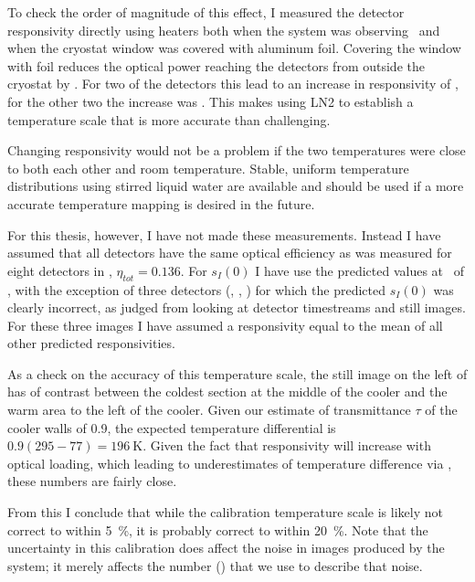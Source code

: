 To check the order of magnitude of this effect, I measured the detector responsivity directly using heaters both when the system was observing \ecco\ and when the cryostat window was covered with aluminum foil.
Covering the window with foil reduces the optical power reaching the detectors from outside the cryostat by .
For two of the detectors this lead to an increase in responsivity of , for the other two the increase was .
This makes using LN2 to establish a temperature scale that is more accurate than  challenging.

Changing responsivity would not be a problem if the two temperatures were close to both each other and room temperature.
Stable, uniform temperature distributions using stirred liquid water are available \cite{dietlein_aqueous_2008} and should be used if a more accurate temperature mapping is desired in the future.

For this thesis, however, I have not made these measurements.
Instead I have assumed that all detectors have the same optical efficiency as was measured for eight detectors in , $\eta_{tot} = 0.136$.
For $s_I(0)$ I have use the predicted values at \SOC\ of , with the exception of three detectors (, , ) for which the predicted $s_I(0)$ was clearly incorrect, as judged from looking at detector timestreams and still images.
For these three images I have assumed a responsivity equal to the mean of all other predicted responsivities.

As a check on the accuracy of this temperature scale, the still image on the left of  has  of contrast between the coldest section at the middle of the cooler and the warm area to the left of the cooler.
Given our estimate of transmittance $\tau$ of the cooler walls of \num{0.9}, the expected temperature differential is $0.9(295-77) = \SI{196}{\K}$.
Given the fact that responsivity will increase with optical loading, which leading to underestimates of temperature difference via , these numbers are fairly close.

From this I conclude that while the calibration temperature scale is likely not correct to within \SI{5}{\percent}, it is probably correct to within \SI{20}{\percent}.
Note that the uncertainty in this calibration does affect the noise in images produced by the system; it merely affects the number (\NETD) that we use to describe that noise.

